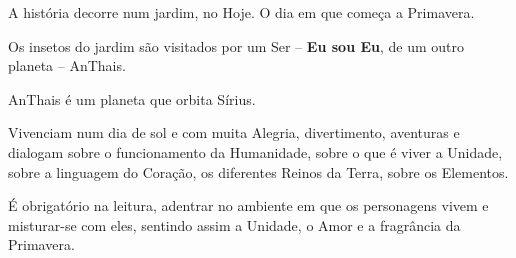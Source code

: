 A história decorre num jardim, no Hoje. O dia em que começa a Primavera.

Os insetos do jardim são visitados por um Ser – \textbf{Eu sou Eu}, de um outro planeta – AnThais.

AnThais é um planeta que orbita Sírius.

Vivenciam num dia de sol e com muita Alegria, divertimento, aventuras e dialogam sobre o funcionamento da Humanidade, sobre o que é viver a Unidade, sobre a linguagem do Coração, os diferentes Reinos da Terra, sobre os Elementos.

É obrigatório na leitura, adentrar no ambiente em que os personagens vivem e misturar-se com eles, sentindo assim a Unidade, o Amor e a fragrância da Primavera.
